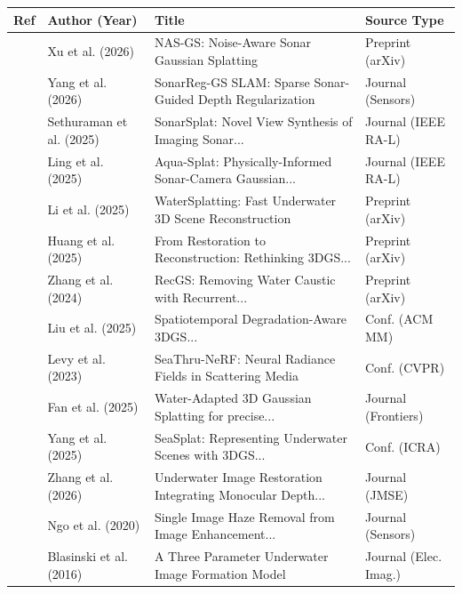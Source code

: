 \documentclass[12pt, a4paper]{article}
\begin{document}
\begin{table}[h]
\centering
\renewcommand{\arraystretch}{1.2}
\scriptsize
\begin{tabularx}{\textwidth}{|l|l|X|l|}
\hline
\textbf{Ref} & \textbf{Author (Year)} & \textbf{Title} & \textbf{Source Type} \\
\hline
\cite{xu2026nasgsnoiseawaresonargaussian} & Xu et al. (2026) & NAS-GS: Noise-Aware Sonar Gaussian Splatting & Preprint (arXiv) \\
\cite{s26154713} & Yang et al. (2026) & SonarReg-GS SLAM: Sparse Sonar-Guided Depth Regularization & Journal (Sensors) \\
\cite{11223217} & Sethuraman et al. (2025) & SonarSplat: Novel View Synthesis of Imaging Sonar... & Journal (IEEE RA-L) \\
\cite{11184160} & Ling et al. (2025) & Aqua-Splat: Physically-Informed Sonar-Camera Gaussian... & Journal (IEEE RA-L) \\
\cite{li2025watersplattingfastunderwater3d} & Li et al. (2025) & WaterSplatting: Fast Underwater 3D Scene Reconstruction & Preprint (arXiv) \\
\cite{huang2025restorationreconstructionrethinking3d} & Huang et al. (2025) & From Restoration to Reconstruction: Rethinking 3DGS... & Preprint (arXiv) \\
\cite{zhang2024recgsremovingwatercaustic} & Zhang et al. (2024) & RecGS: Removing Water Caustic with Recurrent... & Preprint (arXiv) \\
\cite{Liu_2025} & Liu et al. (2025) & Spatiotemporal Degradation-Aware 3DGS... & Conf. (ACM MM) \\
\cite{10203316} & Levy et al. (2023) & SeaThru-NeRF: Neural Radiance Fields in Scattering Media & Conf. (CVPR) \\
\cite{10.3389/fmars.2025.1573612} & Fan et al. (2025) & Water-Adapted 3D Gaussian Splatting for precise... & Journal (Frontiers) \\
\cite{11128502} & Yang et al. (2025) & SeaSplat: Representing Underwater Scenes with 3DGS... & Conf. (ICRA) \\
\cite{jmse14060563} & Zhang et al. (2026) & Underwater Image Restoration Integrating Monocular Depth... & Journal (JMSE) \\
\cite{s20185170} & Ngo et al. (2020) & Single Image Haze Removal from Image Enhancement... & Journal (Sensors) \\
\cite{doi:10.2352/ISSN.2470-1173.2016.18.DPMI-252} & Blasinski et al. (2016) & A Three Parameter Underwater Image Formation Model & Journal (Elec. Imag.) \\

\end{tabularx}
\end{table}
\end{document}

